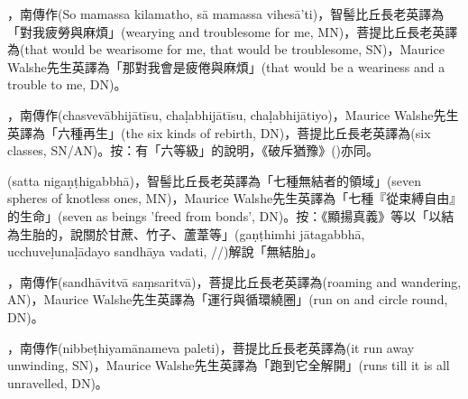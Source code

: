 \startitemgroup[noteitems]
\item{}，南傳作(So mamassa kilamatho, sā mamassa vihesā’ti)，智髻比丘長老英譯為「對我疲勞與麻煩」(wearying and troublesome for me, MN)，菩提比丘長老英譯為(that would be wearisome for me, that would be troublesome, SN)，Maurice Walshe先生英譯為「那對我會是疲倦與麻煩」(that would be a weariness and a trouble to me, DN)。
\stopitemgroup

\startitemgroup[noteitems]
\item{}，南傳作(chasvevābhijātīsu, chaḷabhijātīsu, chaḷabhijātiyo)，Maurice Walshe先生英譯為「六種再生」(the six kinds of rebirth, DN)，菩提比丘長老英譯為(six classes, SN/AN)。按：有「六等級」的說明，《破斥猶豫》()亦同。
\stopitemgroup

\startitemgroup[noteitems]
\item{}(satta nigaṇṭhigabbhā)，智髻比丘長老英譯為「七種無結者的領域」(seven spheres of knotless ones, MN)，Maurice Walshe先生英譯為「七種『從束縛自由』的生命」(seven as beings 'freed from bonds', DN)。按：《顯揚真義》等以「以結為生胎的，說關於甘蔗、竹子、蘆葦等」(gaṇṭhimhi jātagabbhā, ucchuveḷunaḷādayo sandhāya vadati, //)解說「無結胎」。
\stopitemgroup

\startitemgroup[noteitems]
\item{}，南傳作(sandhāvitvā saṃsaritvā)，菩提比丘長老英譯為(roaming and wandering, AN)，Maurice Walshe先生英譯為「運行與循環繞圈」(run on and circle round, DN)。
\stopitemgroup

\startitemgroup[noteitems]
\item{}，南傳作(nibbeṭhiyamānameva paleti)，菩提比丘長老英譯為(it run away unwinding, SN)，Maurice Walshe先生英譯為「跑到它全解開」(runs till it is all unravelled, DN)。
\stopitemgroup

